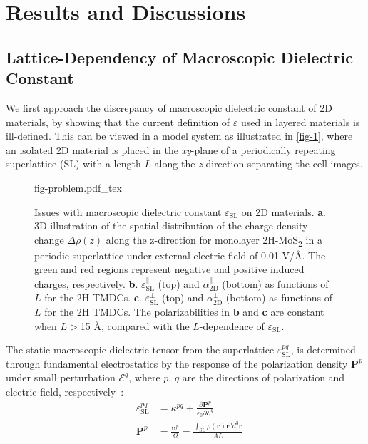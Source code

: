 
\section{Results and Discussions}
\label{sec:diel-results-discussions}

\subsection{Lattice-Dependency of Macroscopic Dielectric Constant}
\label{sec:diel-latt-depend-macr}

We first approach the discrepancy of macroscopic dielectric constant
of 2D materials, by showing that the current definition of
$\varepsilon$ used in layered materials is ill-defined.  This can be
viewed in a model system as illustrated
in \autoref{fig-1}, where an isolated 2D material is placed in
the \textit{xy}-plane of a periodically repeating superlattice (SL)
with a length $L$ along the \textit{z}-direction separating the cell
images.%
\begin{figure}[!htbp]
\centering
{fig-problem.pdf_tex}
\caption{\label{fig-1} %
  Issues with macroscopic dielectric constant
  $\varepsilon_{\mathrm{SL}}$ on 2D materials.  \textbf{a}. 3D
  illustration of the spatial distribution of the charge density
  change $\Delta \rho(z)$ along the z-direction for monolayer
  2H-MoS\textsubscript{2} in a periodic superlattice under external
  electric field of 0.01 V/\AA{}.  The green and red regions represent
  negative and positive induced charges, respectively.
  \textbf{b}.  $\varepsilon^{\parallel}_{\mathrm{SL}}$ (top) and
  $\alpha_{\mathrm{2D}}^{\parallel}$ (bottom) as functions of $L$ for
  the 2H TMDCs. \textbf{c}.  $\varepsilon^{\perp}_{\mathrm{SL}}$ (top)
  and $\alpha_{\mathrm{2D}}^{\perp}$ (bottom) as functions of $L$ for
  the 2H TMDCs. The polarizabilities in \textbf{b} and \textbf{c} are
  constant when $L>$15 \AA{}, compared with the $L$-dependence of
  $\varepsilon_{\mathrm{SL}}$. }
\end{figure}
%
The static macroscopic dielectric tensor from the superlattice
$\varepsilon_{\mathrm{SL}}^{pq}$, is determined through fundamental
electrostatics by the response of the polarization density
$\symbf{P}^{p}$ under small perturbation
$\mathscr{E}^{q}$, where $p$, $q$ are the directions of
polarization and electric field,
respectively~\autocite{Dressel_2001_electrodynamics}:
\begin{subequations}
  \begin{eqnarray}
      \label{eq:diele-def-eps-1}
    &\varepsilon_{\mathrm{SL}}^{pq} &= \kappa^{pq} +
                                 {\displaystyle \frac{\partial \symbf{P}^{p}}
                                 {\varepsilon_{0} \partial \mathscr{E}^{q}}} \\
          \label{eq:diele-def-eps-2}
    &\symbf{P}^{p} &=  {\displaystyle \frac{\symbf{u}^{p}}{\Omega}}
                          = {\displaystyle \frac{{\displaystyle
          \int_{\mathrm{SL}} \rho(\symbf{r}) \symbf{r}^{p} d^{3}\symbf{r}}}
                          {AL}}
  \end{eqnarray}
\end{subequations}
